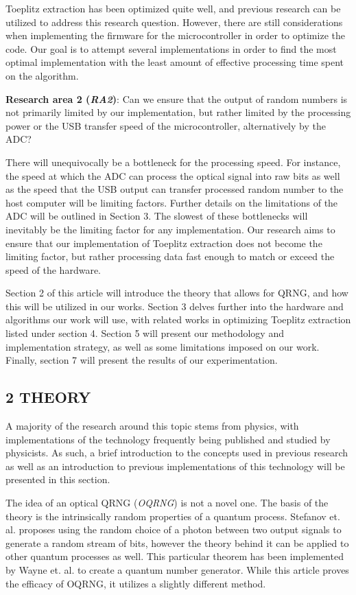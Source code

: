 Toeplitz extraction has been optimized quite well, and previous research can be utilized to address this research question. However, there are still considerations when implementing the firmware for the microcontroller in order to optimize the code. Our goal is to attempt several implementations in order to find the most optimal implementation with the least amount of effective processing time spent on the algorithm.

\textbf{Research area 2 (\emph{RA2})}: Can we ensure that the output of random numbers is not primarily limited by our implementation, but rather limited by the processing power or the USB transfer speed of the microcontroller, alternatively by the ADC?

There will unequivocally be a bottleneck for the processing speed. For instance, the speed at which the ADC can process the optical signal into raw bits as well as the speed that the USB output can transfer processed random number to the host computer will be limiting factors. Further details on the limitations of the ADC will be outlined in Section 3. The slowest of these bottlenecks will inevitably be the limiting factor for any implementation. Our research aims to ensure that our implementation of Toeplitz extraction does not become the limiting factor, but rather processing data fast enough to match or exceed the speed of the hardware.

Section 2 of this article will introduce the theory that allows for QRNG, and how this will be utilized in our works. Section 3 delves further into the hardware and algorithms our work will use, with related works in optimizing Toeplitz extraction listed under section 4. Section 5 will present our methodology and implementation strategy, as well as some limitations imposed on our work. Finally, section 7 will present the results of our experimentation.

\subsection{2 THEORY}\label{theory}

A majority of the research around this topic stems from physics, with implementations of the technology frequently being published and studied by physicists. As such, a brief introduction to the concepts used in previous research as well as an introduction to previous implementations of this technology will be presented in this section.

The idea of an optical QRNG (\emph{OQRNG}) is not a novel one. The basis of the theory is the intrinsically random properties of a quantum process. Stefanov et. al. \cite{StefanovOptical} proposes using the random choice of a photon between two output signals to generate a random stream of bits, however the theory behind it can be applied to other quantum processes as well. This particular theorem has been implemented by Wayne et. al. \cite{Wayne} to create a quantum number generator. While this article proves the efficacy of OQRNG, it utilizes a slightly different method.

